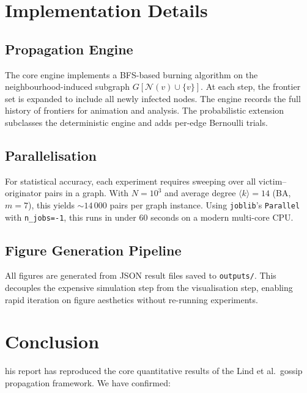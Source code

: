 \documentclass[9pt,a4paper,twocolumn,twoside]{tau-class/tau}
\begin{document}
\section{Implementation Details}

\subsection{Propagation Engine}

The core engine implements a BFS-based burning algorithm on the neighbourhood-induced subgraph $G[\mathcal{N}(v) \cup \{v\}]$. At each step, the frontier set is expanded to include all newly infected nodes. The engine records the full history of frontiers for animation and analysis. The probabilistic extension subclasses the deterministic engine and adds per-edge Bernoulli trials.

\subsection{Parallelisation}

For statistical accuracy, each experiment requires sweeping over all victim--originator pairs in a graph. With $N = 10^3$ and average degree $\langle k \rangle = 14$ (BA, $m=7$), this yields $\sim 14\,000$ pairs per graph instance. Using \texttt{joblib}'s \texttt{Parallel} with \texttt{n\_jobs=-1}, this runs in under 60 seconds on a modern multi-core CPU.

\subsection{Figure Generation Pipeline}

All figures are generated from JSON result files saved to \texttt{outputs/}. This decouples the expensive simulation step from the visualisation step, enabling rapid iteration on figure aesthetics without re-running experiments.

\section{Conclusion}\label{sec:conclusion}

his report has reproduced the core quantitative results of the Lind et al.\ gossip propagation framework. We have confirmed:
\end{document}
